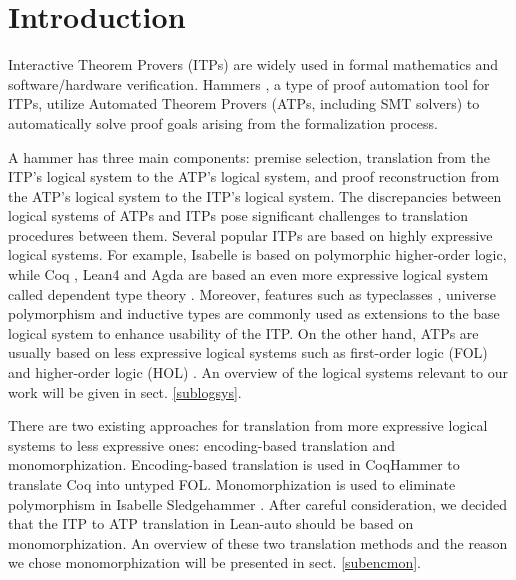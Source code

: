 \section{Introduction}

  Interactive Theorem Provers (ITPs) \cite{Harrison2014HistoryOI}
  are widely used in formal mathematics and software/hardware verification. Hammers
  \cite{Blanchette2016HammeringTQ}\cite{Czajka2018HammerFC}, a type of proof automation tool for
  ITPs, utilize Automated Theorem Provers (ATPs, including SMT solvers) to automatically solve proof goals
  arising from the formalization process.  
  
  A hammer has three main components:
  premise selection, translation from the ITP's logical system to the ATP's
  logical system, and proof reconstruction from the ATP's logical system to
  the ITP's logical system. The discrepancies between logical systems of ATPs and ITPs pose
  significant challenges to translation procedures between them.
  Several popular ITPs are based on highly expressive logical systems.
  For example, Isabelle \cite{Isabelle} is based on polymorphic higher-order logic, while
  Coq \cite{CoqRefMan}, Lean4 \cite{Lean4} and Agda \cite{Agda}
  are based an even more expressive logical system called dependent type theory \cite{LambdaWithType}\cite{Coquand1988}.
  Moreover, features such as typeclasses \cite{TypeClassHaskell}, universe polymorphism \cite{UPolyCoq} and inductive types \cite{CICIndDef}
  are commonly used as extensions to the base logical system to enhance usability of the ITP.
  On the other hand, ATPs are usually based on less expressive logical systems such
  as first-order logic (FOL) \cite{CVC5}\cite{Vampire}\cite{Z3Paper}\cite{EProver} and
  higher-order logic (HOL) \cite{HOVampire}\cite{ZipperpositionMakeWork}\cite{HOEProver}.
  An overview of the logical systems relevant to our work will be given in sect. \ref{sublogsys}.
 
  There are two existing approaches for translation from more expressive
  logical systems to less expressive ones: encoding-based translation and monomorphization.
  Encoding-based translation is used in CoqHammer \cite{Czajka2018HammerFC}
  to translate Coq into untyped FOL. Monomorphization is used to
  eliminate polymorphism in Isabelle Sledgehammer \cite{Blanchette2016HammeringTQ}\cite{Paulson2012ThreeYO}.
  After careful consideration, we decided that the ITP to ATP translation in
  Lean-auto should be based on monomorphization. An overview of these two
  translation methods and the reason we chose monomorphization will be presented in sect. \ref{subencmon}.

